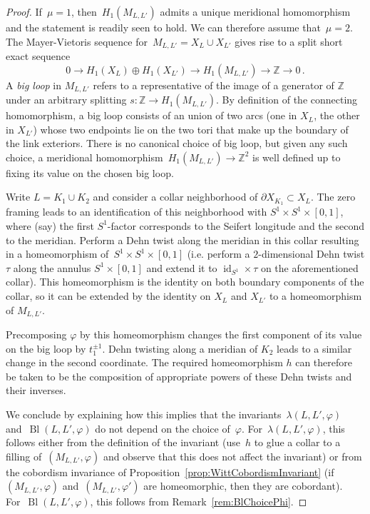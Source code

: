 \documentclass[10.9pt,a4paper]{amsart}
\theoremstyle{definition}
\theoremstyle{remark}
\newcommand{\Z}{\mathbb{Z}}
\newcommand{\id}{\operatorname{id}}
\newcommand{\Bl}{\operatorname{Bl}}
\begin{document}
\begin{proof}
If~$\mu=1$, then~$H_1(M_{L,L'})$ admits a unique meridional homomorphism and the statement is readily seen to hold.
We can therefore assume that~$\mu=2$.
The Mayer-Vietoris sequence for~$M_{L,L'}=X_L \cup X_{L'}$ gives rise to a split short exact sequence
$$
0 \to H_1(X_L) \oplus H_1(X_{L'}) \to H_1(M_{L,L'}) \to \Z  \to 0\,.
$$
A \emph{big loop} in $M_{L,L'}$ refers to a representative of the image of a generator of $\Z$ under an arbitrary splitting $s \colon \Z \to H_1(M_{L,L'})$.
By definition of the connecting homomorphism,  a big loop consists of an union of two arcs (one in $X_L$, the other in $X_{L'}$) whose two endpoints lie on the two tori that make up the boundary of the link exteriors.
There is no canonical choice of big loop,  but given any such choice,
a meridional homomorphism~$ H_1(M_{L,L'})\to \Z^2$ is well defined up to fixing its value on the chosen big loop.


Write $L=K_1 \cup K_2$  and consider a collar neighborhood of $\partial X_{K_1} \subset X_L$.
The zero framing leads to an identification of this neighborhood with $S^1 \times S^1 \times [0,1]$, where (say) the first $S^1$-factor corresponds to the Seifert longitude and the second to the meridian.
Perform a Dehn twist along the meridian in this collar resulting in a homeomorphism of~$S^1 \times S^1 \times [0,1]$ (i.e.  perform a $2$-dimensional Dehn twist $\tau$ along the annulus $S^1 \times [0,1]$ and extend it to $\id_{S^1} \times \tau$ on the aforementioned collar).
This homeomorphism is the identity on both boundary components of the collar,  so it can be extended by the identity on $X_L$ and $X_{L'}$  to a homeomorphism of $M_{L,L'}$.

Precomposing $\varphi$ by this homeomorphism changes the first component of its value on the big loop by $t_1^{\pm 1}$.
Dehn twisting along a meridian of $K_2$ leads to a similar change in the second coordinate.
The required homeomorphism $h$ can therefore be taken to be the composition of appropriate powers of these Dehn twists and their inverses.

We conclude by explaining how this implies that the invariants~$\lambda(L,L',\varphi)$ and~$\Bl(L,L',\varphi)$ do not depend on the choice of~$\varphi$.
For~$\lambda(L,L',\varphi)$,  this follows either from the definition of the invariant (use~$h$ to glue a collar to a filling of~$(M_{L,L'},\varphi)$ and observe that this does not affect the invariant) or from the cobordism invariance of Proposition~\ref{prop:WittCobordismInvariant} (if~$(M_{L,L'},\varphi)$ and~$(M_{L,L'},\varphi')$ are homeomorphic, then they are cobordant).
For~$\Bl(L,L',\varphi)$,  this follows from Remark~\ref{rem:BlChoicePhi}.
\end{proof}
\end{document}

